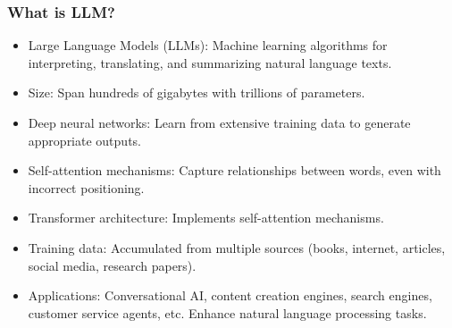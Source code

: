 


\begin{frame}[fragile]\frametitle{What is LLM?}

\begin{itemize}
\item Large Language Models (LLMs): Machine learning algorithms for interpreting, translating, and summarizing natural language texts.
\item Size: Span hundreds of gigabytes with trillions of parameters.
\item Deep neural networks: Learn from extensive training data to generate appropriate outputs.
\item Self-attention mechanisms: Capture relationships between words, even with incorrect positioning.
\item Transformer architecture: Implements self-attention mechanisms.
\item Training data: Accumulated from multiple sources (books, internet, articles, social media, research papers).
\item Applications: Conversational AI, content creation engines, search engines, customer service agents, etc.
Enhance natural language processing tasks.
\end{itemize}

\end{frame}




